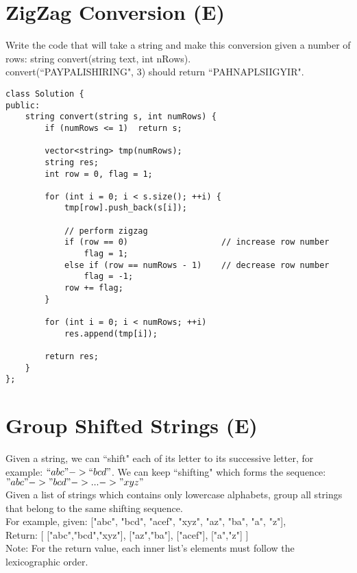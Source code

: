 \section{ZigZag Conversion (E)}
Write the code that will take a string and make this conversion given a number of rows: string convert(string text, int nRows). \\
convert(``PAYPALISHIRING", 3) should return ``PAHNAPLSIIGYIR". \\

\begin{lstlisting}
class Solution {
public:
    string convert(string s, int numRows) {
        if (numRows <= 1)  return s;
        
        vector<string> tmp(numRows);
        string res;
        int row = 0, flag = 1;
        
        for (int i = 0; i < s.size(); ++i) {
            tmp[row].push_back(s[i]);
            
            // perform zigzag
            if (row == 0)                   // increase row number
                flag = 1;
            else if (row == numRows - 1)    // decrease row number
                flag = -1;
            row += flag;
        }
        
        for (int i = 0; i < numRows; ++i)
            res.append(tmp[i]);
            
        return res;
    }
};
\end{lstlisting}


\section{Group Shifted Strings (E)}
Given a string, we can ``shift" each of its letter to its successive letter, for example: $``abc" -> ``bcd"$. We can keep ``shifting" which forms the sequence: $"abc" -> "bcd" -> ... -> "xyz"$\\

Given a list of strings which contains only lowercase alphabets, group all strings that belong to the same shifting sequence.\\
For example, given: ["abc", "bcd", "acef", "xyz", "az", "ba", "a", "z"], \\
Return:
[
  ["abc","bcd","xyz"],
  ["az","ba"],
  ["acef"],
  ["a","z"]
] \\

Note: For the return value, each inner list's elements must follow the lexicographic order.\\

